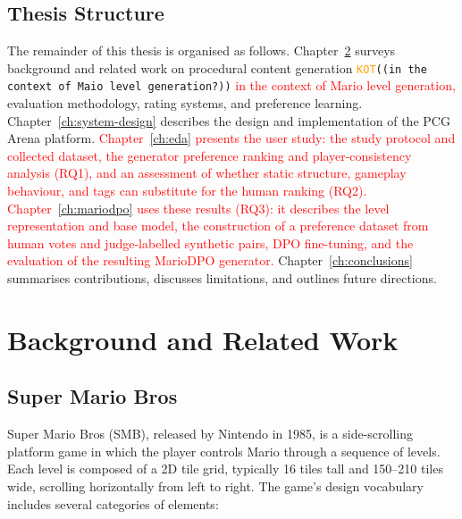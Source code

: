 \documentclass[shortabstract, mgr, english]{iithesis}
\newcommand{\DEBUG}[1]{{#1}} %
\newcommand{\KOT}[1]{\DEBUG{\tt{\textcolor{orange}{KOT}(}{#1}{)}}}
\newcommand{\changed}[1]{\textcolor{red}{#1}}
\begin{document}
\section{Thesis Structure}
\label{sec:intro-structure}

The remainder of this thesis is organised as follows.
Chapter~\ref{ch:background} surveys background and related work on procedural
content generation \KOT{(in the context of Maio level generation?)} \changed{in the context of Mario level generation,} evaluation methodology,
rating systems, and preference learning. Chapter~\ref{ch:system-design} describes the design and implementation
of the PCG Arena platform. \changed{Chapter~\ref{ch:eda} presents the user
study: the study protocol and collected dataset, the generator preference
ranking and player-consistency analysis (RQ1), and an assessment of whether
static structure, gameplay behaviour, and tags can substitute for the human
ranking (RQ2). Chapter~\ref{ch:mariodpo} uses these
results (RQ3): it describes the level representation and base model, the
construction of a preference dataset from human votes and judge-labelled
synthetic pairs, DPO fine-tuning, and the evaluation of the resulting MarioDPO
generator.} Chapter~\ref{ch:conclusions} summarises contributions,
discusses limitations, and outlines future directions.


\chapter{Background and Related Work}
\label{ch:background}

\section{Super Mario Bros}
\label{sec:bg-smb}

\begingroup\color{red}
Super Mario Bros (SMB), released by Nintendo in 1985, is a side-scrolling platform
game in which the player controls Mario through a sequence of levels. Each level is
composed of a 2D tile grid, typically 16 tiles tall and 150--210 tiles wide, scrolling
horizontally from left to right. The game's design vocabulary includes several
categories of elements:
\end{document}
